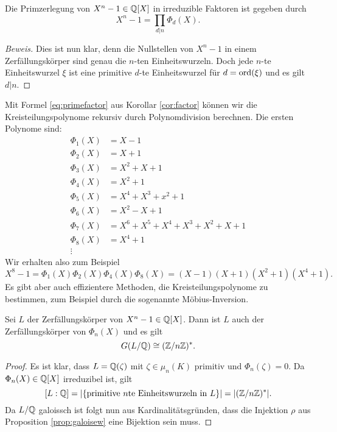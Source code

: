 \documentclass{book}
\begin{document}
\begin{cor}\label{cor:factor} Die Primzerlegung von $X^n -1 \in \mathbb{Q}[X]$ in irreduzible Faktoren ist gegeben durch
	\begin{equation}\label{eq:primefactor}
			X^n-1 = \prod_{d|n} \Phi_d(X).
	\end{equation}
\end{cor}
\begin{proof}[Beweis]
	Dies ist nun klar, denn die Nullstellen von $X^n -1$ in einem Zerfällungskörper sind genau die
	$n$-ten Einheitswurzeln. Doch jede $n$-te Einheitswurzel $\xi$ ist eine primitive $d$-te
	Einheitswurzel für $d = \operatorname{ord}(\xi)$ und es gilt $d|n$. 
\end{proof}

\begin{exa}
	Mit Formel \eqref{eq:primefactor} aus Korollar \ref{cor:factor} können wir die
	Kreisteilungspolynome rekursiv durch Polynomdivision berechnen. Die ersten Polynome sind:
	\[
		\begin{aligned}
			\Phi_1(X) &= X - 1\\
			\Phi_2(X) &= X + 1\\
			\Phi_3(X) &= X^2 + X + 1\\
			\Phi_4(X) &= X^2 + 1\\
			\Phi_5(X) &= X^4 + X^3 + x^2 + 1\\
			\Phi_6(X) &= X^2 - X + 1\\
			\Phi_7(X) &= X^6 + X^5 + X^4 + X^3 + X^2 + X + 1\\
			\Phi_8(X) &= X^4 + 1\\
			\vdots
		\end{aligned}
	\]
	Wir erhalten also zum Beispiel
	\[
		X^8 - 1 = \Phi_1(X)\Phi_2(X)\Phi_4(X)\Phi_8(X) = (X-1)(X+1)(X^2+1)(X^4+1).
	\]
	Es gibt aber auch effizientere Methoden, die Kreisteilungspolynome zu bestimmen, zum
	Beispiel durch die sogenannte Möbius-Inversion. 
\end{exa}

\begin{cor}
    \label{cor:galewprim}
    Sei $L$ der Zerfällungskörper von $X^n -1 \in \mathbb{Q}[X]$. Dann ist $L$ auch der Zerfällungskörper von $\Phi_n(X)$ und es gilt
    \[
        G(L/\mathbb{Q}) \cong (\mathbb{Z}/n\mathbb{Z})^*.
    \]
\end{cor}
\begin{proof}
    Es ist klar, dass $L = \mathbb{Q}(\zeta)$ mit $\zeta \in \mu_n(K)$ primitiv und $\Phi_n(\zeta) = 0$. Da $\Phi_n(X) \in \mathbb{Q}[X]$ irreduzibel ist, gilt
    \[
        [L:\mathbb{Q}] = |\{\text{primitive $n$te Einheitswurzeln in $L$}\}| = |(\mathbb{Z}/n\mathbb{Z})^*|.
    \]
    Da $L/\mathbb{Q}$ galoissch ist folgt nun aus Kardinalitätsgründen, dass die Injektion $\rho$ aus Proposition \ref{prop:galoisew} eine Bijektion sein muss.
\end{proof}
\end{document}
